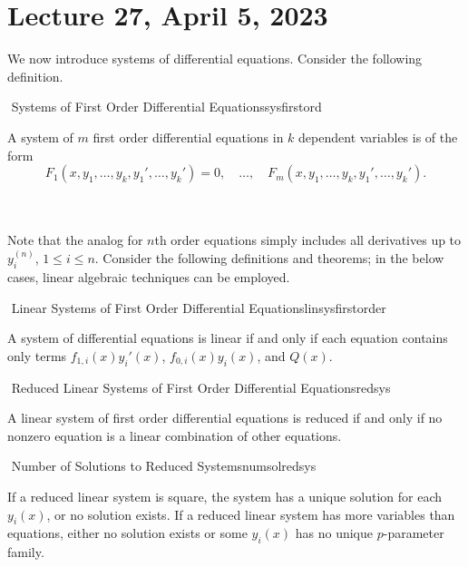 \section{Lecture 27, April 5, 2023}

    We now introduce systems of differential equations. Consider the following definition.
    \begin{definition}{\Stop\,\,Systems of First Order Differential Equations}{sysfirstord}

        A system of \(m\) first order differential equations in \(k\) dependent variables is of the form
        \begin{equation*}
            F_1(x,y_1,\ldots,y_k,y_1',\ldots,y_k')=0,\quad \ldots,\quad F_m(x,y_1,\ldots,y_k,y_1',\ldots,y_k').
        \end{equation*}
        
    \end{definition}
    \vphantom
    \\
    \\
    Note that the analog for \(n\)th order equations simply includes all derivatives up to \(y_i^{(n)}\), \(1\leq i\leq n\). Consider the following definitions and theorems; in the below cases, linear algebraic techniques can be employed.
    \begin{definition}{\Stop\,\,Linear Systems of First Order Differential Equations}{linsysfirstorder}

        A system of differential equations is linear if and only if each equation contains only terms \(f_{1,i}(x)y_i'(x)\), \(f_{0,i}(x)y_i(x)\), and \(Q(x)\).
        
    \end{definition}
    \begin{definition}{\Stop\,\,Reduced Linear Systems of First Order Differential Equations}{redsys}

        A linear system of first order differential equations is reduced if and only if no nonzero equation is a linear combination of other equations.
        
    \end{definition}
    \begin{theorem}{\Stop\,\,Number of Solutions to Reduced Systems}{numsolredsys}

        If a reduced linear system is square, the system has a unique solution for each \(y_i(x)\), or no solution exists. If a reduced linear system has more variables than equations, either no solution exists or some \(y_i(x)\) has no unique \(p\)-parameter family.
        
    \end{theorem}
